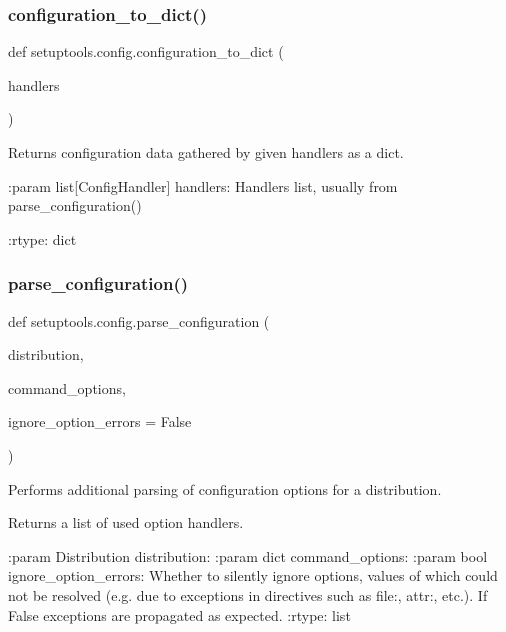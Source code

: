 \subsubsection{\texorpdfstring{configuration\+\_\+to\+\_\+dict()}{configuration\_to\_dict()}}
{\footnotesize\ttfamily def setuptools.\+config.\+configuration\+\_\+to\+\_\+dict (\begin{DoxyParamCaption}\item[{}]{handlers }\end{DoxyParamCaption})}

\begin{DoxyVerb}Returns configuration data gathered by given handlers as a dict.

:param list[ConfigHandler] handlers: Handlers list,
    usually from parse_configuration()

:rtype: dict
\end{DoxyVerb}
 \mbox{\label{namespacesetuptools_1_1config_a2c2e6e2aaa466506a52dec243e695eb6}} 
\subsubsection{\texorpdfstring{parse\+\_\+configuration()}{parse\_configuration()}}
{\footnotesize\ttfamily def setuptools.\+config.\+parse\+\_\+configuration (\begin{DoxyParamCaption}\item[{}]{distribution,  }\item[{}]{command\+\_\+options,  }\item[{}]{ignore\+\_\+option\+\_\+errors = {\ttfamily False} }\end{DoxyParamCaption})}

\begin{DoxyVerb}Performs additional parsing of configuration options
for a distribution.

Returns a list of used option handlers.

:param Distribution distribution:
:param dict command_options:
:param bool ignore_option_errors: Whether to silently ignore
    options, values of which could not be resolved (e.g. due to exceptions
    in directives such as file:, attr:, etc.).
    If False exceptions are propagated as expected.
:rtype: list
\end{DoxyVerb}
 \mbox{\label{namespacesetuptools_1_1config_ab0debe927cfd8e85227b203ca09c60b8}} 
